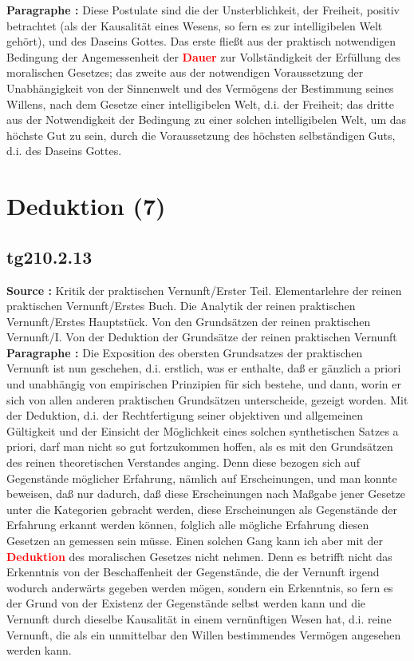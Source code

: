 \documentclass[a4paper,12pt,twoside]{book}
\newcommand{\match}[1]{\textcolor{red}{\textbf{#1}}}
\newcommand{\unnumberedsection}[1]{
	\section*{#1}
	\addcontentsline{toc}{section}{#1}
	\markright{#1}
}
\begin{document}
	\noindent\textbf{Paragraphe : }Diese Postulate sind die der Unsterblichkeit, der Freiheit, positiv betrachtet (als der Kausalität eines Wesens, so fern es zur intelligibelen Welt gehört), und des Daseins Gottes. Das erste fließt aus der praktisch notwendigen Bedingung der Angemessenheit der \match{Dauer} zur Vollständigkeit der Erfüllung des moralischen Gesetzes; das zweite aus der notwendigen Voraussetzung der Unabhängigkeit von der Sinnenwelt und des Vermögens der Bestimmung seines Willens, nach dem Gesetze einer intelligibelen Welt, d.i. der Freiheit; das dritte aus der Notwendigkeit der Bedingung zu einer solchen intelligibelen Welt, um das höchste Gut zu sein, durch die Voraussetzung des höchsten selbständigen Guts, d.i. des Daseins Gottes. 
	
	\unnumberedsection{Deduktion (7)} 
	\subsection*{tg210.2.13} 
	\textbf{Source : }Kritik der praktischen Vernunft/Erster Teil. Elementarlehre der reinen praktischen Vernunft/Erstes Buch. Die Analytik der reinen praktischen Vernunft/Erstes Hauptstück. Von den Grundsätzen der reinen praktischen Vernunft/I. Von der Deduktion der Grundsätze der reinen praktischen Vernunft\\  
	
	\noindent\textbf{Paragraphe : }Die Exposition des obersten Grundsatzes der praktischen Vernunft ist nun geschehen, d.i. erstlich, was er enthalte, daß er gänzlich a priori und unabhängig von empirischen Prinzipien für sich bestehe, und dann, worin er sich von allen anderen praktischen Grundsätzen unterscheide, gezeigt worden. Mit der Deduktion, d.i. der Rechtfertigung seiner objektiven und allgemeinen Gültigkeit und der Einsicht der Möglichkeit eines solchen synthetischen Satzes a priori, darf man nicht so gut fortzukommen hoffen, als es mit den Grundsätzen des reinen theoretischen Verstandes anging. Denn diese bezogen sich auf Gegenstände möglicher Erfahrung, nämlich auf Erscheinungen, und man konnte beweisen, daß nur dadurch, daß diese Erscheinungen nach Maßgabe jener Gesetze unter die Kategorien gebracht werden, diese Erscheinungen als Gegenstände der Erfahrung erkannt werden können, folglich alle mögliche Erfahrung diesen Gesetzen an gemessen sein müsse. Einen solchen  Gang kann ich aber mit der \match{Deduktion} des moralischen Gesetzes nicht nehmen. Denn es betrifft nicht das Erkenntnis von der Beschaffenheit der Gegenstände, die der Vernunft irgend wodurch anderwärts gegeben werden mögen, sondern ein Erkenntnis, so fern es der Grund von der Existenz der Gegenstände selbst werden kann und die Vernunft durch dieselbe Kausalität in einem vernünftigen Wesen hat, d.i. reine Vernunft, die als ein unmittelbar den Willen bestimmendes Vermögen angesehen werden kann. 
	
\end{document}
